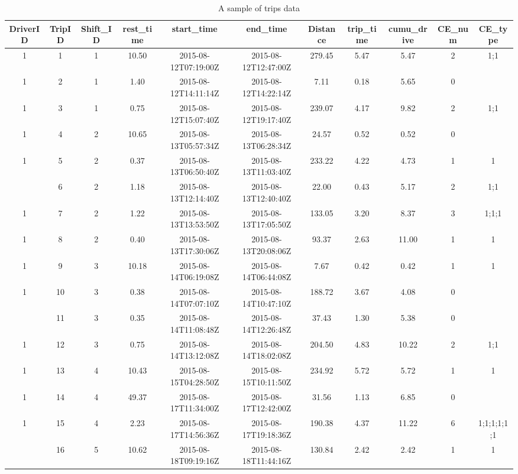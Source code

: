 \documentclass[]{elsarticle} %
\begin{document}
\begin{landscape}\begin{table}[!h]

\caption{\label{tab:tripsdata}A sample of trips data}
\centering
\begin{tabular}{ccccccccccc}
\toprule
DriverID & TripID & Shift\_ID & rest\_time & start\_time & end\_time & Distance & trip\_time & cumu\_drive & CE\_num & CE\_type\\
\midrule
1 & 1 & 1 & 10.50 & 2015-08-12T07:19:00Z & 2015-08-12T12:47:00Z & 279.45 & 5.47 & 5.47 & 2 & 1;1\\
1 & 2 & 1 & 1.40 & 2015-08-12T14:11:14Z & 2015-08-12T14:22:14Z & 7.11 & 0.18 & 5.65 & 0 & \\
1 & 3 & 1 & 0.75 & 2015-08-12T15:07:40Z & 2015-08-12T19:17:40Z & 239.07 & 4.17 & 9.82 & 2 & 1;1\\
1 & 4 & 2 & 10.65 & 2015-08-13T05:57:34Z & 2015-08-13T06:28:34Z & 24.57 & 0.52 & 0.52 & 0 & \\
1 & 5 & 2 & 0.37 & 2015-08-13T06:50:40Z & 2015-08-13T11:03:40Z & 233.22 & 4.22 & 4.73 & 1 & 1\\
\addlinespace
1 & 6 & 2 & 1.18 & 2015-08-13T12:14:40Z & 2015-08-13T12:40:40Z & 22.00 & 0.43 & 5.17 & 2 & 1;1\\
1 & 7 & 2 & 1.22 & 2015-08-13T13:53:50Z & 2015-08-13T17:05:50Z & 133.05 & 3.20 & 8.37 & 3 & 1;1;1\\
1 & 8 & 2 & 0.40 & 2015-08-13T17:30:06Z & 2015-08-13T20:08:06Z & 93.37 & 2.63 & 11.00 & 1 & 1\\
1 & 9 & 3 & 10.18 & 2015-08-14T06:19:08Z & 2015-08-14T06:44:08Z & 7.67 & 0.42 & 0.42 & 1 & 1\\
1 & 10 & 3 & 0.38 & 2015-08-14T07:07:10Z & 2015-08-14T10:47:10Z & 188.72 & 3.67 & 4.08 & 0 & \\
\addlinespace
1 & 11 & 3 & 0.35 & 2015-08-14T11:08:48Z & 2015-08-14T12:26:48Z & 37.43 & 1.30 & 5.38 & 0 & \\
1 & 12 & 3 & 0.75 & 2015-08-14T13:12:08Z & 2015-08-14T18:02:08Z & 204.50 & 4.83 & 10.22 & 2 & 1;1\\
1 & 13 & 4 & 10.43 & 2015-08-15T04:28:50Z & 2015-08-15T10:11:50Z & 234.92 & 5.72 & 5.72 & 1 & 1\\
1 & 14 & 4 & 49.37 & 2015-08-17T11:34:00Z & 2015-08-17T12:42:00Z & 31.56 & 1.13 & 6.85 & 0 & \\
1 & 15 & 4 & 2.23 & 2015-08-17T14:56:36Z & 2015-08-17T19:18:36Z & 190.38 & 4.37 & 11.22 & 6 & 1;1;1;1;1;1\\
\addlinespace
1 & 16 & 5 & 10.62 & 2015-08-18T09:19:16Z & 2015-08-18T11:44:16Z & 130.84 & 2.42 & 2.42 & 1 & 1\\

\end{tabular}
\end{table}
\end{landscape}
\end{document}
